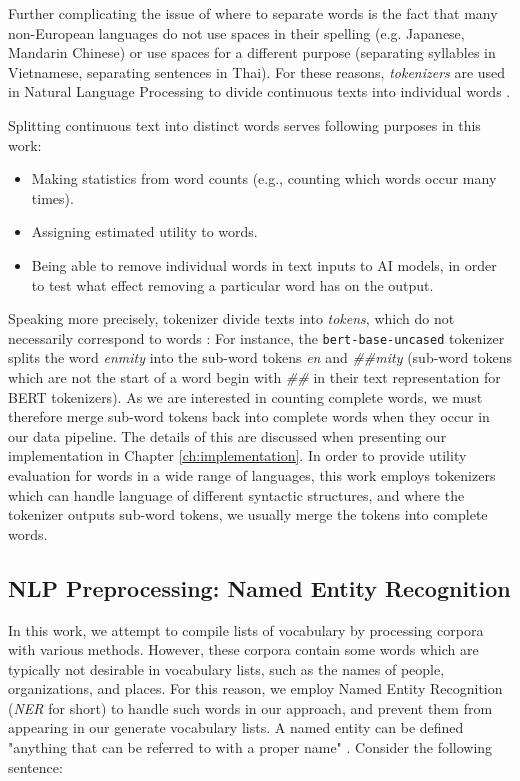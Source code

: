 Further complicating the issue of where to separate words is the fact that many non-European languages do not use spaces in their spelling (e.g. Japanese, Mandarin Chinese) or use spaces for a different purpose (separating syllables in Vietnamese, separating sentences in Thai).
For these reasons, \textit{tokenizers} are used in Natural Language Processing to divide continuous texts into individual words \cite{jurafskySpeechLanguageProcessing2025}.


Splitting continuous text into distinct words serves following purposes in this work:
\begin{itemize}
	\item Making statistics from word counts (e.g., counting which words occur many times).
	\item Assigning estimated utility to words.
	\item Being able to remove individual words in text inputs to AI models, in order to test what effect removing a particular word has on the output.
\end{itemize}

Speaking more precisely, tokenizer divide texts into \textit{tokens}, which do not necessarily correspond to words \cite{jurafskySpeechLanguageProcessing2025}:
For instance, the \texttt{bert-base-uncased} tokenizer splits the word \textit{enmity} into the sub-word tokens \textit{en} and \textit{\#\#mity} (sub-word tokens which are not the start of a word begin with \textit{\#\#} in their text representation for BERT tokenizers).
As we are interested in counting complete words, we must therefore merge sub-word tokens back into complete words when they occur in our data pipeline.
The details of this are discussed when presenting our implementation in Chapter \ref{ch:implementation}.
In order to provide utility evaluation for words in a wide range of languages, this work employs tokenizers which can handle language of different syntactic structures, and where the tokenizer outputs sub-word tokens, we usually merge the tokens into complete words.

\subsection{NLP Preprocessing: Named Entity Recognition}
In this work, we attempt to compile lists of vocabulary by processing corpora with various methods.
However, these corpora contain some words which are typically not desirable in vocabulary lists, such as the names of people, organizations, and places.
For this reason, we employ Named Entity Recognition \cite{jurafskySpeechLanguageProcessing2025} (\textit{NER} for short) to handle such words in our approach, and prevent them from appearing in our generate vocabulary lists.
A named entity can be defined "anything that can be referred to with a proper name" \cite{jurafskySpeechLanguageProcessing2025}.
Consider the following sentence:

